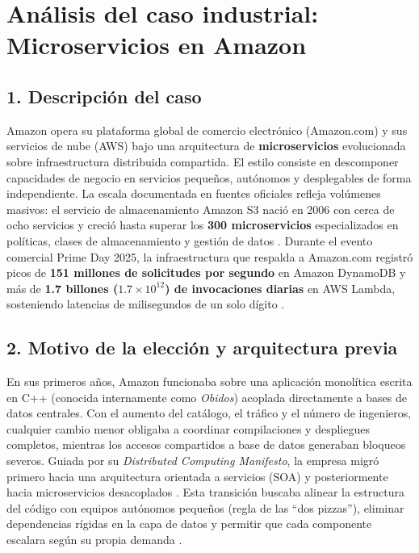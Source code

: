 \documentclass[10pt,letterpaper]{article}
\begin{document}
\section*{Análisis del caso industrial: Microservicios en Amazon}

\subsection*{1. Descripción del caso}
Amazon opera su plataforma global de comercio electrónico (Amazon.com) y sus servicios de nube (AWS) bajo una arquitectura de \textbf{microservicios} evolucionada sobre infraestructura distribuida compartida. El estilo consiste en descomponer capacidades de negocio en servicios pequeños, autónomos y desplegables de forma independiente. La escala documentada en fuentes oficiales refleja volúmenes masivos: el servicio de almacenamiento Amazon S3 nació en 2006 con cerca de ocho servicios y creció hasta superar los \textbf{300 microservicios} especializados en políticas, clases de almacenamiento y gestión de datos \cite{vogels2023monoliths}. Durante el evento comercial Prime Day 2025, la infraestructura que respalda a Amazon.com registró picos de \textbf{151 millones de solicitudes por segundo} en Amazon DynamoDB y más de \textbf{1.7 billones ($1.7 \times 10^{12}$) de invocaciones diarias} en AWS Lambda, sosteniendo latencias de milisegundos de un solo dígito \cite{yun2025primeday}.

\subsection*{2. Motivo de la elección y arquitectura previa}
En sus primeros años, Amazon funcionaba sobre una aplicación monolítica escrita en C++ (conocida internamente como \emph{Obidos}) acoplada directamente a bases de datos centrales. Con el aumento del catálogo, el tráfico y el número de ingenieros, cualquier cambio menor obligaba a coordinar compilaciones y despliegues completos, mientras los accesos compartidos a base de datos generaban bloqueos severos. Guiada por su \emph{Distributed Computing Manifesto}, la empresa migró primero hacia una arquitectura orientada a servicios (SOA) y posteriormente hacia microservicios desacoplados \cite{vogels2023monoliths}. Esta transición buscaba alinear la estructura del código con equipos autónomos pequeños (regla de las ``dos pizzas''), eliminar dependencias rígidas en la capa de datos y permitir que cada componente escalara según su propia demanda \cite{velepucha2023survey}.
\end{document}
